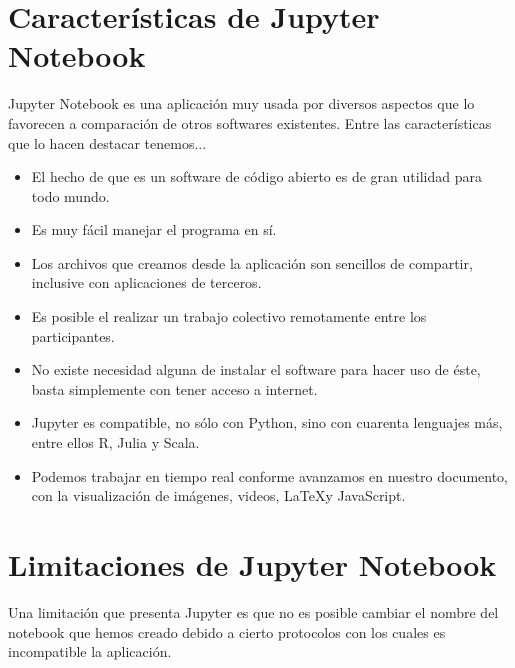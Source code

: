 \section{Características de Jupyter Notebook}
Jupyter Notebook es una aplicación muy usada por diversos aspectos que lo favorecen a comparación de otros softwares existentes. Entre las características que lo hacen destacar tenemos... 
\begin{itemize}
\item El hecho de que es un software de código abierto es de gran utilidad para todo mundo.

\item Es muy fácil manejar el programa en sí.

\item Los archivos que creamos desde la aplicación son sencillos de compartir, inclusive con aplicaciones de terceros.

\item Es posible el realizar un trabajo colectivo remotamente entre los participantes.
\item No existe necesidad alguna de instalar el software para hacer uso de éste, basta simplemente con tener acceso a internet.

\item Jupyter es compatible, no sólo con Python, sino con cuarenta lenguajes más, entre ellos R, Julia y Scala.

\item Podemos trabajar en tiempo real conforme avanzamos en nuestro documento, con la visualización de imágenes, videos, \LaTeX y JavaScript.

\end{itemize}

\section{Limitaciones de Jupyter Notebook}
Una limitación que presenta Jupyter es que no es posible cambiar el nombre del notebook que hemos creado debido a cierto protocolos con los cuales es incompatible la aplicación.

